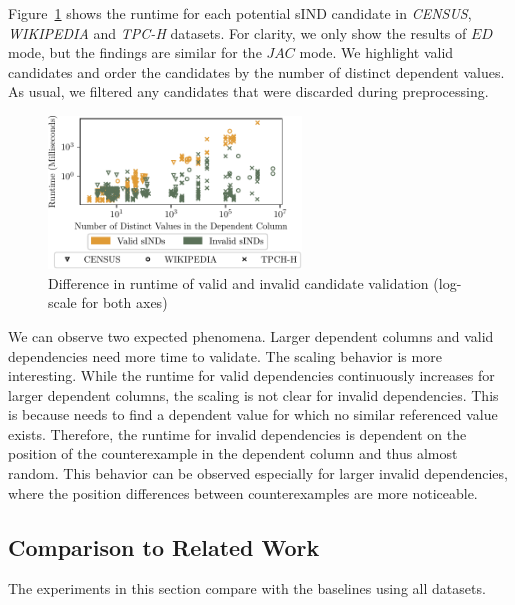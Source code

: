 Figure~\ref{fig:eval:valid_dependencies} shows the runtime for each potential sIND candidate in \emph{CENSUS}, \emph{WIKIPEDIA} and \emph{TPC-H} datasets.
For clarity, we only show the results of $ED$ mode, but the findings are similar for the $JAC$ mode.
We highlight valid candidates and order the candidates by the number of distinct dependent values.
As usual, we filtered any candidates that were discarded during preprocessing.
\begin{figure}[ht]
    \centering
    \includegraphics[width=0.6\textwidth]{figures/evaluation/valid_sIND_impact-crop.pdf}
    \caption{Difference in runtime of valid and invalid candidate validation (log-scale for both axes)}
    \label{fig:eval:valid_dependencies}
\end{figure}

We can observe two expected phenomena.
Larger dependent columns and valid dependencies need more time to validate.
The scaling behavior is more interesting.
While the runtime for valid dependencies continuously increases for larger dependent columns, the scaling is not clear for invalid dependencies.
This is because \sawfish needs to find a dependent value for which no similar referenced value exists.
Therefore, the runtime for invalid dependencies is dependent on the position of the counterexample in the dependent column and thus almost random.
This behavior can be observed especially for larger invalid dependencies, where the position differences between counterexamples are more noticeable.

\subsection{Comparison to Related Work}

The experiments in this section compare \sawfish with the baselines using all datasets.

